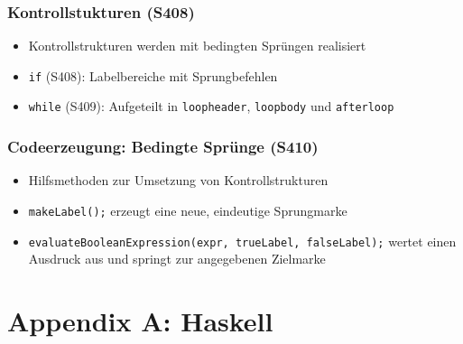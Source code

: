 \subsubsection{Kontrollstukturen (S408)}
\begin{itemize}
	\item Kontrollstrukturen werden mit bedingten Sprüngen realisiert
	\item \texttt{if} (S408): Labelbereiche mit Sprungbefehlen
	\item \texttt{while} (S409): Aufgeteilt in \texttt{loopheader}, \texttt{loopbody} und \texttt{afterloop}
\end{itemize}

\subsubsection{Codeerzeugung: Bedingte Sprünge (S410)}
\begin{itemize}
	\item Hilfsmethoden zur Umsetzung von Kontrollstrukturen
	\item \texttt{makeLabel();} erzeugt eine neue, eindeutige Sprungmarke
	\item \texttt{evaluateBooleanExpression(expr, trueLabel, falseLabel);} wertet einen Ausdruck aus und springt zur angegebenen Zielmarke
\end{itemize}



\section{Appendix A: Haskell}


